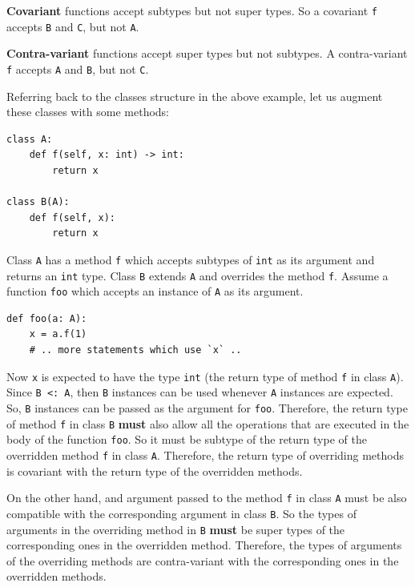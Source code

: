 \textbf{Covariant} functions accept subtypes but not super types. So a covariant \lstinline|f| accepts \lstinline|B| and \lstinline|C|, but not \lstinline|A|.

\textbf{Contra-variant} functions accept super types but not subtypes. A contra-variant \lstinline|f| accepts \lstinline|A| and \lstinline|B|, but not \lstinline|C|.

Referring back to the classes structure in the above example, let us augment these classes with some methods:

\begin{lstlisting}
class A:
	def f(self, x: int) -> int:
		return x
		
class B(A):
	def f(self, x):
		return x
\end{lstlisting}

Class \lstinline|A| has a method \lstinline|f| which accepts subtypes of \lstinline|int| as its argument and returns an \lstinline|int| type. Class \lstinline|B| extends \lstinline|A| and overrides the method \lstinline|f|. Assume a function \lstinline|foo| which accepts an instance of \lstinline|A| as its argument.

\begin{lstlisting}
def foo(a: A):
	x = a.f(1)
	# .. more statements which use `x` ..
\end{lstlisting}

Now \lstinline|x| is expected to have the type \lstinline|int| (the return type of method \lstinline|f| in class \lstinline|A|). Since \lstinline|B <: A|, then \lstinline|B| instances can be used whenever \lstinline|A| instances are expected. So, \lstinline|B| instances can be passed as the argument for \lstinline|foo|. Therefore, the return type of method \lstinline|f| in class \lstinline|B| \textbf{must} also allow all the operations that are executed in the body of the function \lstinline|foo|. So it must be subtype of the return type of the overridden method \lstinline|f| in class \lstinline|A|. Therefore, the return type of overriding methods is covariant with the return type of the overridden methods.

On the other hand, and argument passed to the method \lstinline|f| in class \lstinline|A| must be also compatible with the corresponding argument in class \lstinline|B|. So the types of arguments in the overriding method in \lstinline|B| \textbf{must} be super types of the corresponding ones in the overridden method. Therefore, the types of arguments of the overriding methods are contra-variant with the corresponding ones in the overridden methods. \\

